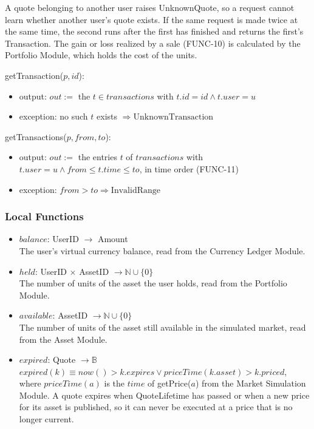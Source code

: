 \documentclass[12pt, titlepage]{article}
\begin{document}
\noindent A quote belonging to another user raises UnknownQuote, so a request
cannot learn whether another user's quote exists. If the same request is
made twice at the same time, the second runs after the first has finished
and returns the first's Transaction. The gain or loss realized by a sale
(FUNC-10) is calculated by the Portfolio Module, which holds the cost of the
units.

\medskip

\noindent getTransaction($p, \mathit{id}$):
\begin{itemize}
\item output: $\mathit{out} :=$ the $t \in \mathit{transactions}$ with
  $t.\mathit{id} = \mathit{id} \wedge t.\mathit{user} = u$
\item exception: no such $t$ exists $\Rightarrow \mathrm{UnknownTransaction}$
\end{itemize}

\noindent getTransactions($p, \mathit{from}, \mathit{to}$):
\begin{itemize}
\item output: $\mathit{out} :=$ the entries $t$ of $\mathit{transactions}$
  with $t.\mathit{user} = u \wedge \mathit{from} \leq t.\mathit{time} \leq
  \mathit{to}$, in time order (FUNC-11)
\item exception: $\mathit{from} > \mathit{to} \Rightarrow
  \mathrm{InvalidRange}$
\end{itemize}

\subsubsection{Local Functions}

\begin{itemize}
\item $\mathit{balance}$: UserID $\rightarrow$ Amount\\
  The user's virtual currency balance, read from the Currency Ledger Module.
\item $\mathit{held}$: UserID $\times$ AssetID $\rightarrow \mathbb{N} \cup
  \{0\}$\\
  The number of units of the asset the user holds, read from the Portfolio
  Module.
\item $\mathit{available}$: AssetID $\rightarrow \mathbb{N} \cup \{0\}$\\
  The number of units of the asset still available in the simulated market,
  read from the Asset Module.
\item $\mathit{expired}$: Quote $\rightarrow \mathbb{B}$\\
  $\mathit{expired}(k) \equiv \mathit{now}() > k.\mathit{expires} \vee
  \mathit{priceTime}(k.\mathit{asset}) > k.\mathit{priced}$, where
  $\mathit{priceTime}(a)$ is the $\mathit{time}$ of getPrice($a$) from the
  Market Simulation Module. A quote expires when \textsf{QuoteLifetime} has
  passed or when a new price for its asset is published, so it can never be
  executed at a price that is no longer current.
\end{itemize}
\end{document}
